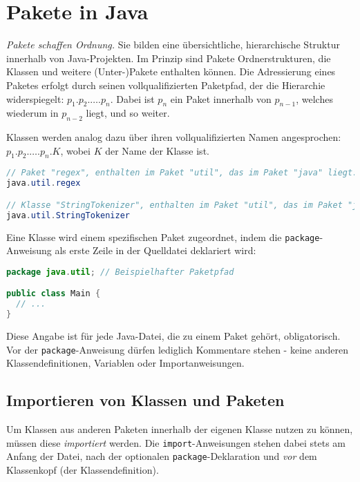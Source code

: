 \chapter{Pakete in Java}
\label{chap:pakete}

\textit{Pakete schaffen Ordnung.} Sie bilden eine übersichtliche, hierarchische Struktur innerhalb von Java-Projekten.
Im Prinzip sind Pakete Ordnerstrukturen, die Klassen und weitere (Unter-)Pakete enthalten können.
Die Adressierung eines Paketes erfolgt durch seinen vollqualifizierten Paketpfad, der die Hierarchie widerspiegelt:
$p_1.p_2.\dots.p_n$. Dabei ist $p_n$ ein Paket innerhalb von $p_{n-1}$, welches wiederum in $p_{n-2}$ liegt, und so weiter.

Klassen werden analog dazu über ihren vollqualifizierten Namen angesprochen: $p_1.p_2.\dots.p_n.K$, wobei $K$ der Name der Klasse ist.

\begin{lstlisting}[language=Java, caption={Beispiele für Paket- und Klassenspezifikationen}, label=lst:paketbeispiele]
// Paket "regex", enthalten im Paket "util", das im Paket "java" liegt:
java.util.regex

// Klasse "StringTokenizer", enthalten im Paket "util", das im Paket "java" liegt:
java.util.StringTokenizer
\end{lstlisting}

Eine Klasse wird einem spezifischen Paket zugeordnet, indem die \texttt{package}-Anweisung als erste Zeile in der Quelldatei deklariert wird:
\begin{lstlisting}[language=Java, caption={Deklaration der Paketzugehörigkeit}]
package java.util; // Beispielhafter Paketpfad

public class Main {
  // ...
}
\end{lstlisting}
Diese Angabe ist für jede Java-Datei, die zu einem Paket gehört, obligatorisch. Vor der \texttt{package}-Anweisung dürfen lediglich Kommentare stehen
- keine anderen Klassendefinitionen, Variablen oder Importanweisungen.

\section{Importieren von Klassen und Paketen}
\label{sec:importieren}

Um Klassen aus anderen Paketen innerhalb der eigenen Klasse nutzen zu können, müssen diese \textit{importiert} werden.
Die \texttt{import}-Anweisungen stehen dabei stets am Anfang der Datei, nach der optionalen \texttt{package}-Deklaration und 
\textit{vor} dem Klassenkopf (der Klassendefinition).

